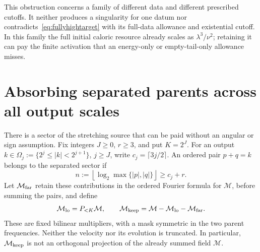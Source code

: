 \documentclass[11pt]{article}
\begin{document}
This obstruction concerns a family of different data and different
prescribed cutoffs. It neither produces a singularity for one datum nor
contradicts~\eqref{eq:fullyhightarget} with its full-data allowance and
existential cutoff. In this family the full initial caloric resource
already scales as $\lambda^3/\nu^2$; retaining it can pay the finite
activation that an energy-only or empty-tail-only allowance misses.

\section{Absorbing separated parents across all output scales}

There is a sector of the stretching source that can be paid without
an angular or sign assumption. Fix integers $J\geq0$, $r\geq3$, and put
$K=2^J$. For an output $k\in\Omega_j:=\{2^j\leq|k|<2^{j+1}\}$,
$j\geq J$, write $c_j=\lceil3j/2\rceil$. An ordered pair $p+q=k$
belongs to the separated sector if
\[
 n:=\left\lfloor\log_2\max\{|p|,|q|\}\right\rfloor\geq c_j+r.
\]
Let $\mathcal M_{\rm far}$ retain these contributions in the ordered
Fourier formula for $\mathcal M$, before summing the pairs, and define
\[
 \mathcal M_{\rm lo}=P_{<K}\mathcal M,\qquad
 \mathcal M_{\rm keep}=\mathcal M-\mathcal M_{\rm lo}-\mathcal M_{\rm far}.
\]
These are fixed bilinear multipliers, with a mask symmetric in the two
parent frequencies. Neither the velocity nor its evolution is truncated.
In particular, $\mathcal M_{\rm keep}$ is not an orthogonal projection
of the already summed field $\mathcal M$.
\end{document}
